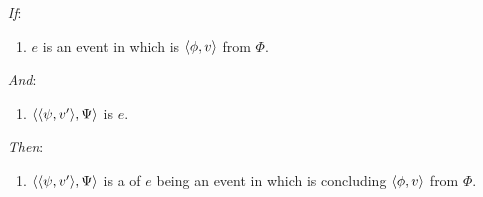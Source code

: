 \begin{note}
  \begin{proposition}
    \label{prop:hinge}


    \begin{itemize}
    \item[\emph{If}:]
      \begin{enumerate}[label=\alph*., ref=(\alph*), series=propHingeSer]
      \item
        \label{prop:hinge:typical}
        \(e\) is an event in which \vAgent{} is \tCV{} \(\langle \phi, v \rangle\) from \(\Phi\).
      \end{enumerate}
    \item[\emph{And}:]
      \begin{enumerate}[label=\alph*., ref=(\alph*), resume*=propHingeSer]
      \item
        \label{prop:hinge:rep}
        \(\langle \langle \psi, v' \rangle, \Psi \rangle\) is \tRep{} \(e\).
      \end{enumerate}
    \item[\emph{Then}:]
      \begin{enumerate}[label=\alph*., ref=(\alph*), resume*=propHingeSer]
      \item
        \label{prop:hinge:requ}
        \(\langle \langle \psi, v' \rangle, \Psi \rangle\) is a \requ{} of \(e\) being an event in which \vAgent{} is concluding \(\langle \phi, v \rangle\) from \(\Phi\).
      \end{enumerate}
    \end{itemize}
    \vspace{-\baselineskip}
  \end{proposition}


\end{note}
